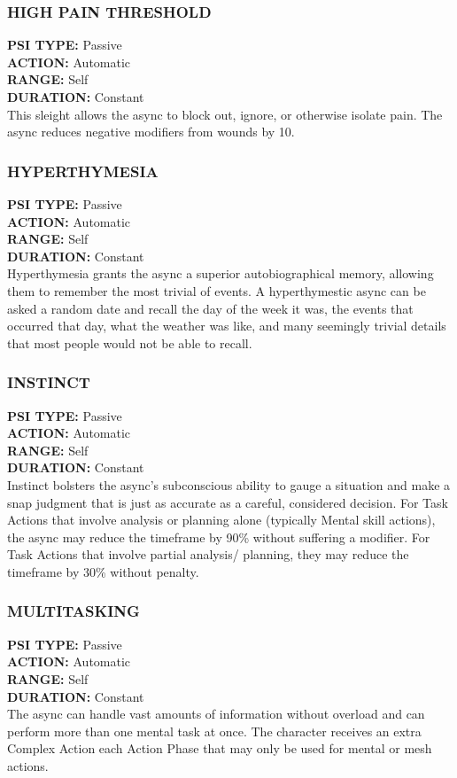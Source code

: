 \subsubsection{HIGH PAIN THRESHOLD}
\textbf{PSI TYPE:} Passive \\ 
\textbf{ACTION:} Automatic \\ 
\textbf{RANGE:} Self \\ 
\textbf{DURATION:} Constant \\
This sleight allows the async to block out, ignore, or
otherwise isolate pain. The async reduces negative
modifiers from wounds by 10.

\subsubsection{HYPERTHYMESIA}
\textbf{PSI TYPE:} Passive \\ 
\textbf{ACTION:} Automatic \\ 
\textbf{RANGE:} Self \\ 
\textbf{DURATION:} Constant \\
Hyperthymesia grants the async a superior autobiographical
memory, allowing them to remember the
most trivial of events. A hyperthymestic async can be
asked a random date and recall the day of the week
it was, the events that occurred that day, what the
weather was like, and many seemingly trivial details
that most people would not be able to recall.

\subsubsection{INSTINCT}
\textbf{PSI TYPE:} Passive \\ 
\textbf{ACTION:} Automatic \\ 
\textbf{RANGE:} Self \\ 
\textbf{DURATION:} Constant \\
Instinct bolsters the async’s subconscious ability to
gauge a situation and make a snap judgment that
is just as accurate as a careful, considered decision.
For Task Actions that involve analysis or planning
alone (typically Mental skill actions), the async may
reduce the timeframe by 90\% without suffering a
modifier. For Task Actions that involve partial analysis/
planning, they may reduce the timeframe by 30\%
without penalty.

\subsubsection{MULTITASKING}
\textbf{PSI TYPE:} Passive \\ 
\textbf{ACTION:} Automatic \\ 
\textbf{RANGE:} Self \\ 
\textbf{DURATION:} Constant \\
The async can handle vast amounts of information
without overload and can perform more than one
mental task at once. The character receives an extra
Complex Action each Action Phase that may only be
used for mental or mesh actions.

